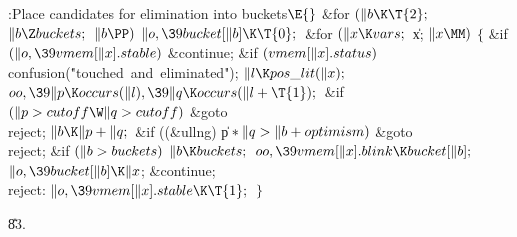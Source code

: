 \B{}:Place candidates for elimination into buckets\X${}\E{}$\6
\&{for} ${}(\|b\K\T{2};{}$ ${}\|b\Z\\{buckets};{}$ ${}\|b\PP){}$\1\5
${}\|o,\39\\{bucket}[\|b]\K\T{0};{}$\2\6
\&{for} ${}(\|x\K\\{vars};{}$ \|x; ${}\|x\MM){}$\5
${}\{{}$\1\6
\&{if} ${}(\|o,\39\\{vmem}[\|x].\\{stable}){}$\1\5
\&{continue};\2\6
\&{if} ${}(\\{vmem}[\|x].\\{status}){}$\1\5
\\{confusion}(\.{"touched\ and\ elimina}\)\.{ted"});\2\6
${}\|l\K\\{pos\_lit}(\|x);{}$\6
${}\\{oo},\39\|p\K\\{occurs}(\|l),\39\|q\K\\{occurs}(\|l+\T{1});{}$\6
\&{if} ${}(\|p>\\{cutoff}\W\|q>\\{cutoff}){}$\1\5
\&{goto} \\{reject};\2\6
${}\|b\K\|p+\|q;{}$\6
\&{if} ((\&{ullng}) \|p${}*\|q>\|b+\\{optimism}){}$\1\5
\&{goto} \\{reject};\2\6
\&{if} ${}(\|b>\\{buckets}){}$\1\5
${}\|b\K\\{buckets};{}$\2\6
${}\\{oo},\39\\{vmem}[\|x].\\{blink}\K\\{bucket}[\|b];{}$\6
${}\|o,\39\\{bucket}[\|b]\K\|x{}$;\5
\&{continue};\6
\4\\{reject}:\5
${}\|o,\39\\{vmem}[\|x].\\{stable}\K\T{1};{}$\6
\4${}\}{}$\2\par
\U83.\fi

